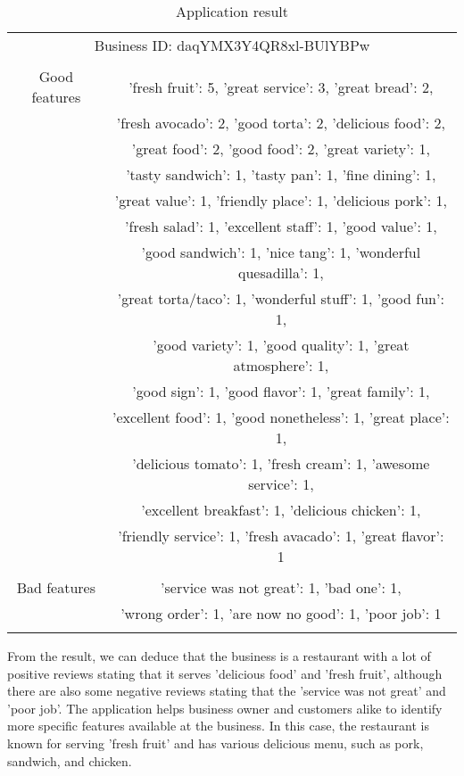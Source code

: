     \begin{table}
        \centering
        \tiny
        \caption{Application result}
        \begin{tabular}{c|c}
            \hline
            \multicolumn{2}{c}{Business ID: daqYMX3Y4QR8xl-BUlYBPw}\\
            \multicolumn{2}{c}{ }\\
            \hline
            Good features &'fresh fruit': 5, 'great service': 3, 'great bread': 2,\\
            &'fresh avocado': 2, 'good torta': 2, 'delicious food': 2,\\
            &'great food': 2, 'good food': 2, 'great variety': 1,\\
            &'tasty sandwich': 1, 'tasty pan': 1, 'fine dining': 1,\\
            &'great value': 1, 'friendly place': 1, 'delicious pork': 1,\\
            &'fresh salad': 1, 'excellent staff': 1, 'good value': 1,\\
            &'good sandwich': 1, 'nice tang': 1, 'wonderful quesadilla': 1,\\
            &'great torta/taco': 1, 'wonderful stuff': 1, 'good fun': 1,\\
            &'good variety': 1, 'good quality': 1, 'great atmosphere': 1,\\
            &'good sign': 1, 'good flavor': 1, 'great family': 1,\\
            &'excellent food': 1, 'good nonetheless': 1, 'great place': 1,\\
            &'delicious tomato': 1, 'fresh cream': 1, 'awesome service': 1,\\
            &'excellent breakfast': 1, 'delicious chicken': 1,\\
            &'friendly service': 1, 'fresh avacado': 1, 'great flavor': 1\\
            &\\
            \hline
            Bad features &'service was not great': 1, 'bad one': 1,\\
            &'wrong order': 1, 'are now no good': 1, 'poor job': 1\\
            &\\
            \hline
             
        \end{tabular}
    \end{table}

From the result, we can deduce that the business is a restaurant with a lot of positive reviews stating that it serves 'delicious food' and 'fresh fruit', although there are also some negative reviews stating that the 'service was not great' and 'poor job'. The application helps business owner and customers alike to identify more specific features available at the business. In this case, the restaurant is known for serving 'fresh fruit' and has various delicious menu, such as pork, sandwich, and chicken.
